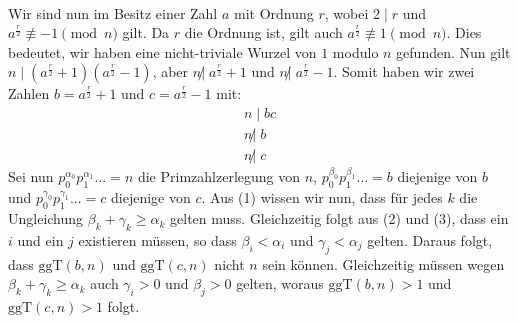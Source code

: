 \paragraph{}

Wir sind nun im Besitz einer Zahl $a$ mit Ordnung $r$, wobei $2 \mid r$ und $a^\frac{r}{2} \not\equiv -1 \pmod{n}$ gilt. Da $r$ die Ordnung ist, gilt auch $a^\frac{r}{2} \not\equiv 1 \pmod{n}$. Dies bedeutet, wir haben eine nicht-triviale Wurzel von $1$ modulo $n$ gefunden. Nun gilt $n \mid (a^\frac{r}{2} + 1)(a^\frac{r}{2} - 1)$, aber $n \not| \; a^\frac{r}{2} + 1$ und $n \not| \; a^\frac{r}{2} - 1$. Somit haben wir zwei Zahlen $b = a^\frac{r}{2} + 1$ und $c = a^\frac{r}{2} - 1$ mit:
\begin{align}
    n \mid bc \label{eq:1} \\
    n \not| \; b \label{eq:2} \\
    n \not| \; c \label{eq:3}
\end{align}    
Sei nun $p_0^{\alpha_0}p_1^{\alpha_1}... = n$ die Primzahlzerlegung von $n$, $p_0^{\beta_0}p_1^{\beta_1}... = b$ diejenige von $b$ und $p_0^{\gamma_0}p_1^{\gamma_1}... = c$ diejenige von $c$. Aus (1) wissen wir nun, dass für jedes $k$ die Ungleichung $\beta_k + \gamma_k \geq \alpha_k$ gelten muss. Gleichzeitig folgt aus (2) und (3), dass ein $i$ und ein $j$ existieren müssen, so dass $\beta_i < \alpha_i$ und $\gamma_j < \alpha_j$ gelten. Daraus folgt, dass $\text{ggT}(b, n)$ und $\text{ggT}(c, n)$ nicht $n$ sein können. Gleichzeitig müssen wegen $\beta_k + \gamma_k \geq \alpha_k$ auch $\gamma_i > 0$ und $\beta_j > 0$ gelten, woraus $\text{ggT}(b, n) > 1$ und $\text{ggT}(c, n) > 1$ folgt.
